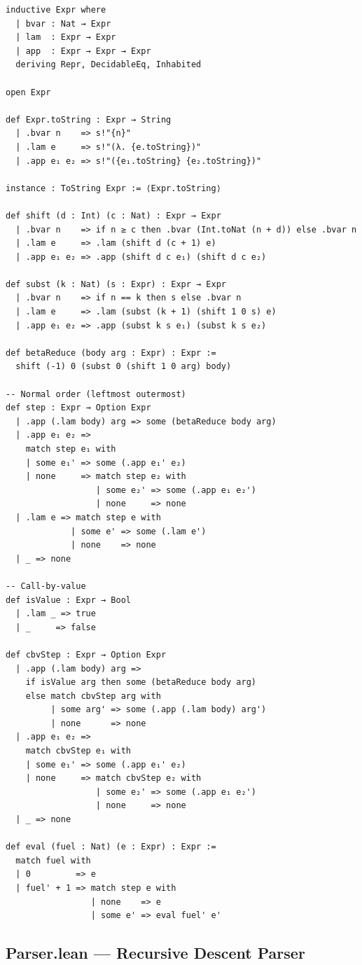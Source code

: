 \documentclass[11pt,a4paper]{article}
\theoremstyle{definition}
\begin{document}
\begin{verbatim}
inductive Expr where
  | bvar : Nat → Expr
  | lam  : Expr → Expr
  | app  : Expr → Expr → Expr
  deriving Repr, DecidableEq, Inhabited

open Expr

def Expr.toString : Expr → String
  | .bvar n    => s!"{n}"
  | .lam e     => s!"(λ. {e.toString})"
  | .app e₁ e₂ => s!"({e₁.toString} {e₂.toString})"

instance : ToString Expr := ⟨Expr.toString⟩

def shift (d : Int) (c : Nat) : Expr → Expr
  | .bvar n    => if n ≥ c then .bvar (Int.toNat (n + d)) else .bvar n
  | .lam e     => .lam (shift d (c + 1) e)
  | .app e₁ e₂ => .app (shift d c e₁) (shift d c e₂)

def subst (k : Nat) (s : Expr) : Expr → Expr
  | .bvar n    => if n == k then s else .bvar n
  | .lam e     => .lam (subst (k + 1) (shift 1 0 s) e)
  | .app e₁ e₂ => .app (subst k s e₁) (subst k s e₂)

def betaReduce (body arg : Expr) : Expr :=
  shift (-1) 0 (subst 0 (shift 1 0 arg) body)

-- Normal order (leftmost outermost)
def step : Expr → Option Expr
  | .app (.lam body) arg => some (betaReduce body arg)
  | .app e₁ e₂ =>
    match step e₁ with
    | some e₁' => some (.app e₁' e₂)
    | none     => match step e₂ with
                  | some e₂' => some (.app e₁ e₂')
                  | none     => none
  | .lam e => match step e with
             | some e' => some (.lam e')
             | none    => none
  | _ => none

-- Call-by-value
def isValue : Expr → Bool
  | .lam _ => true
  | _     => false

def cbvStep : Expr → Option Expr
  | .app (.lam body) arg =>
    if isValue arg then some (betaReduce body arg)
    else match cbvStep arg with
         | some arg' => some (.app (.lam body) arg')
         | none      => none
  | .app e₁ e₂ =>
    match cbvStep e₁ with
    | some e₁' => some (.app e₁' e₂)
    | none     => match cbvStep e₂ with
                  | some e₂' => some (.app e₁ e₂')
                  | none     => none
  | _ => none

def eval (fuel : Nat) (e : Expr) : Expr :=
  match fuel with
  | 0         => e
  | fuel' + 1 => match step e with
                 | none    => e
                 | some e' => eval fuel' e'
\end{verbatim}

\subsection*{Parser.lean --- Recursive Descent Parser}
\end{document}
